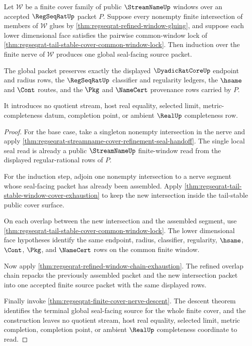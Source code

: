 \begin{theorem}
\label{thm:regseqrat-finite-cover-nerve-induction}
Let $\mathcal W$ be a finite cover family of public $\StreamNameUp$ windows
over an accepted $\RegSeqRatUp$ packet $P$. Suppose every nonempty finite
intersection of members of $\mathcal W$ glues by
\autoref{thm:regseqrat-refined-window-gluing}, and suppose each lower
dimensional face satisfies the pairwise common-window lock of
\autoref{thm:regseqrat-tail-stable-cover-common-window-lock}. Then induction
over the finite nerve of $\mathcal W$ produces one global seal-facing source
packet.

The global packet preserves exactly the displayed $\DyadicRatCoreUp$ endpoint
and radius rows, the $\RegSeqRatUp$ classifier and regularity ledgers, the
$\hsame$ and $\Cont$ routes, and the $\Pkg$ and $\NameCert$ provenance rows
carried by $P$.

It introduces no quotient stream, host real equality, selected limit,
metric-completeness datum, completion point, or ambient $\RealUp$
completeness row.
\end{theorem}
\begin{proof}
For the base case, take a singleton nonempty intersection in the nerve and
apply \autoref{thm:regseqrat-streamname-cover-refinement-seal-handoff}. The
single local seal read is already a public $\StreamNameUp$ finite-window read
from the displayed regular-rational rows of $P$.

For the induction step, adjoin one nonempty intersection to a nerve segment
whose seal-facing packet has already been assembled. Apply
\autoref{thm:regseqrat-tail-stable-window-cover-exhaustion} to keep the new
intersection inside the tail-stable public cover surface.

On each overlap between the new intersection and the assembled segment, use
\autoref{thm:regseqrat-tail-stable-cover-common-window-lock}. The lower
dimensional face hypotheses identify the same endpoint, radius, classifier,
regularity, $\hsame$, $\Cont$, $\Pkg$, and $\NameCert$ rows on the common
finite window.

Now apply \autoref{thm:regseqrat-refined-window-chain-exhaustion}. The refined
overlap chain repacks the previously assembled packet and the new intersection
packet into one accepted finite source packet with the same displayed rows.

Finally invoke \autoref{thm:regseqrat-finite-cover-nerve-descent}. The descent
theorem identifies the terminal global seal-facing source for the whole finite
cover, and the construction leaves no quotient stream, host real equality,
selected limit, metric completion, completion point, or ambient $\RealUp$
completeness coordinate to read.
\end{proof}
